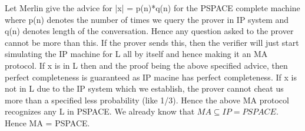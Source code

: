 \documentclass[12pt]{exam}
\begin{document}
\begin{questions}
\begin{solution}
Let Merlin give the advice for |x| = p(n)*q(n) for the PSPACE complete machine
where p(n) denotes the number of times we query the prover in IP system
and q(n) denotes length of the conversation. Hence any question asked to
the prover cannot be more than this. If the prover sends this, then
the verifier will just start simulating the IP machine for L all
by itself and hence making it an MA protocol. If x is in L
then and the proof being the above specified
advice, then perfect completeness is guaranteed as IP macine has perfect
completeness. If x is not in L due to the IP system which we establish,
the prover cannot cheat us more than a specified less probability (like 1/3).
Hence the above MA protocol recognizes any L in PSPACE.
We already know that $MA \subseteq IP = PSPACE$. Hence
MA = PSPACE.
\end{solution}
\end{questions}
\end{document}

